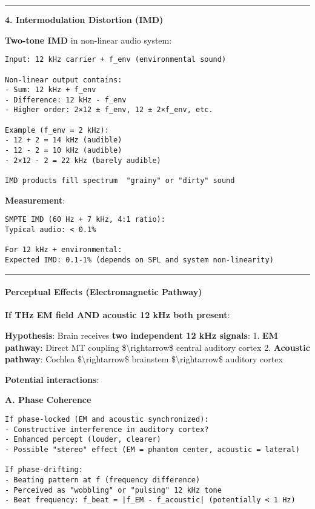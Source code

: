 \begin{center}\rule{0.5\linewidth}{0.5pt}\end{center}

\textbf{4. Intermodulation Distortion (IMD)}

\textbf{Two-tone IMD} in non-linear audio system:

\begin{verbatim}
Input: 12 kHz carrier + f_env (environmental sound)

Non-linear output contains:
- Sum: 12 kHz + f_env
- Difference: 12 kHz - f_env
- Higher order: 2×12 ± f_env, 12 ± 2×f_env, etc.

Example (f_env = 2 kHz):
- 12 + 2 = 14 kHz (audible)
- 12 - 2 = 10 kHz (audible)
- 2×12 - 2 = 22 kHz (barely audible)

IMD products fill spectrum  "grainy" or "dirty" sound
\end{verbatim}

\textbf{Measurement}:

\begin{verbatim}
SMPTE IMD (60 Hz + 7 kHz, 4:1 ratio):
Typical audio: < 0.1%

For 12 kHz + environmental:
Expected IMD: 0.1-1% (depends on SPL and system non-linearity)
\end{verbatim}

\begin{center}\rule{0.5\linewidth}{0.5pt}\end{center}

\paragraph{Perceptual Effects (Electromagnetic
Pathway)}\label{perceptual-effects-electromagnetic-pathway}

\textbf{If THz EM field AND acoustic 12 kHz both present}:

\textbf{Hypothesis}: Brain receives \textbf{two independent 12 kHz
signals}: 1. \textbf{EM pathway}: Direct MT coupling
\$\textbackslash rightarrow\$ central auditory cortex 2.
\textbf{Acoustic pathway}: Cochlea \$\textbackslash rightarrow\$
brainstem \$\textbackslash rightarrow\$ auditory cortex

\textbf{Potential interactions}:

\textbf{A. Phase Coherence}

\begin{verbatim}
If phase-locked (EM and acoustic synchronized):
- Constructive interference in auditory cortex?
- Enhanced percept (louder, clearer)
- Possible "stereo" effect (EM = phantom center, acoustic = lateral)

If phase-drifting:
- Beating pattern at f (frequency difference)
- Perceived as "wobbling" or "pulsing" 12 kHz tone
- Beat frequency: f_beat = |f_EM - f_acoustic| (potentially < 1 Hz)
\end{verbatim}

